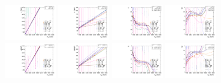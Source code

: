 \begin{figure}[htbp]
  \includegraphics[width=0.2\textwidth]{fig/analysisAppendix/paramSignalShape_allSig_MVV_HP_nobb_HDy_MEAN.pdf}
  \includegraphics[width=0.2\textwidth]{fig/analysisAppendix/paramSignalShape_allSig_MVV_HP_nobb_HDy_SIGMA.pdf}
  \includegraphics[width=0.2\textwidth]{fig/analysisAppendix/paramSignalShape_allSig_MVV_HP_nobb_HDy_ALPHA1.pdf}
  \includegraphics[width=0.2\textwidth]{fig/analysisAppendix/paramSignalShape_allSig_MVV_HP_nobb_HDy_ALPHA2.pdf}\\
  \includegraphics[width=0.2\textwidth]{fig/analysisAppendix/paramSignalShape_allSig_MVV_LP_nobb_HDy_MEAN.pdf}
  \includegraphics[width=0.2\textwidth]{fig/analysisAppendix/paramSignalShape_allSig_MVV_LP_nobb_HDy_SIGMA.pdf}
  \includegraphics[width=0.2\textwidth]{fig/analysisAppendix/paramSignalShape_allSig_MVV_LP_nobb_HDy_ALPHA1.pdf}
  \includegraphics[width=0.2\textwidth]{fig/analysisAppendix/paramSignalShape_allSig_MVV_LP_nobb_HDy_ALPHA2.pdf}\\

\end{figure}
